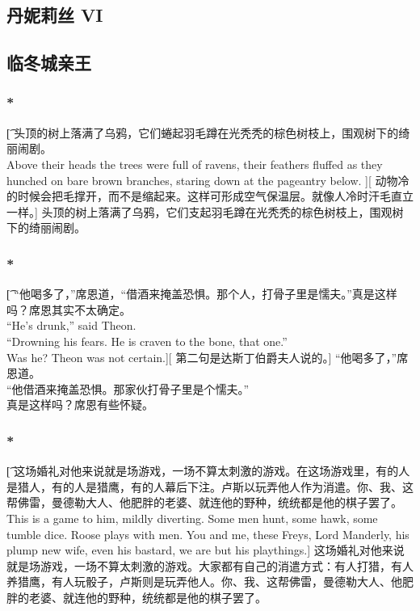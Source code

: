 \documentclass[12pt,a4paper]{article}
\begin{document}
\subsection{丹妮莉丝 VI}

\subsection{临冬城亲王}
\subsubsection{\color{red}*}\t[
	头顶的树上落满了乌鸦，它们蜷起羽毛蹲在光秃秃的棕色树枝上，围观树下的绮丽闹剧。\\
	Above their heads the trees were full of ravens, their feathers fluffed as they hunched on bare
	brown branches, staring down at the pageantry below. ][
	动物冷的时候会把毛撑开，而不是缩起来。这样可形成空气保温层。就像人冷时汗毛直立一样。]
	头顶的树上落满了乌鸦，它们支起羽毛蹲在光秃秃的棕色树枝上，围观树下的绮丽闹剧。
	
\subsubsection{\color{red}*}\t[
	“他喝多了，”席恩道，“借酒来掩盖恐惧。那个人，打骨子里是懦夫。”真是这样吗？席恩其实不太确定。\\
	“He's drunk,” said Theon. \\“Drowning his fears. He is craven to the bone, that one.” \\Was he? Theon was not certain.][
	第二句是达斯丁伯爵夫人说的。]
	“他喝多了，”席恩道。\\“他借酒来掩盖恐惧。那家伙打骨子里是个懦夫。”\\真是这样吗？席恩有些怀疑。
	
\subsubsection{\color{red}*}\t[
	这场婚礼对他来说就是场游戏，一场不算太刺激的游戏。在这场游戏里，有的人是猎人，有的人是猎鹰，有的人幕后下注。卢斯以玩弄他人作为消遣。你、我、这帮佛雷，曼德勒大人、他肥胖的老婆、就连他的野种，统统都是他的棋子罢了。\\
	This is a game to him, mildly diverting. Some men hunt, some hawk, some tumble dice. Roose plays with men. You and me, these Freys, Lord Manderly, his plump new wife, even his bastard, we are but his playthings.]
	这场婚礼对他来说就是场游戏，一场不算太刺激的游戏。大家都有自己的消遣方式：有人打猎，有人养猎鹰，有人玩骰子，卢斯则是玩弄他人。你、我、这帮佛雷，曼德勒大人、他肥胖的老婆、就连他的野种，统统都是他的棋子罢了。
	
\end{document}
